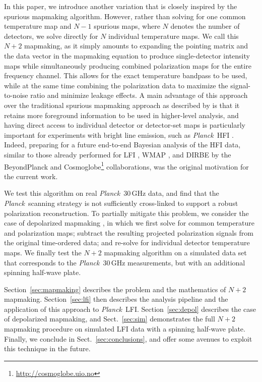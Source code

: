 \documentclass{aa}
\def\Planck{\textit{Planck}}
\begin{document}
In this paper, we introduce another variation that is closely inspired by the spurious mapmaking algorithm. However, rather than solving for one common temperature map and $N-1$ spurious maps, where $N$ denotes the number of detectors, we solve directly for $N$ individual temperature maps. We call this $N+2$ mapmaking, as it simply amounts to expanding the pointing matrix and the data vector in the mapmaking equation to produce single-detector intensity maps while simultaneously producing combined polarization maps for the entire frequency channel. This allows for the exact temperature bandpass to be used, while at the same time combining the polarization data to maximize the signal-to-noise ratio and minimize leakage effects. A main advantage of this approach over the traditional spurious mapmaking approach as described by \citet{spurious} is that it retains more foreground information to be used in higher-level analysis, and having direct access to individual detector or detector-set maps is particularly important for experiments with bright line emission, such as \Planck\ HFI \citep{planck_co:2014}. Indeed, preparing for a future end-to-end Bayesian analysis of the HFI data, similar to those already performed for LFI \citep{bp01}, WMAP \citep{watts2023_dr1}, and DIRBE \citep{CG02_01} by the BeyondPlanck and Cosmoglobe\footnote{\url{http://cosmoglobe.uio.no}} collaborations, was the original motivation for the current work.  

We test this algorithm on real \Planck\ 30\,GHz data, and find that the \Planck\ scanning strategy is not sufficiently cross-linked to support a robust polarization reconstruction. To partially mitigate this problem, we consider the case of depolarized mapmaking \citep[e.g.,][]{npipe}, in which we first solve for common temperature and polarization maps; subtract the resulting projected polarization signals from the original time-ordered data; and re-solve for individual detector temperature maps. We finally test the $N+2$ mapmaking algorithm on a simulated data set that corresponds to the \Planck\ 30\,GHz measurements, but with an additional spinning half-wave plate.  

Section~\ref{sec:mapmaking} describes the problem and the mathematics of $N+2$ mapmaking. Section~\ref{sec:lfi} then describes the analysis pipeline and the application of this approach to \Planck\ LFI. Section~\ref{sec:depol} describes the case of depolarized mapmaking, and Sect.~\ref{sec:sim} demonstrates the full $N+2$ mapmaking procedure on simulated LFI data with a spinning half-wave plate. Finally, we conclude in Sect.~\ref{sec:conclusions}, and offer some avenues to exploit this technique in the future.
\end{document}
